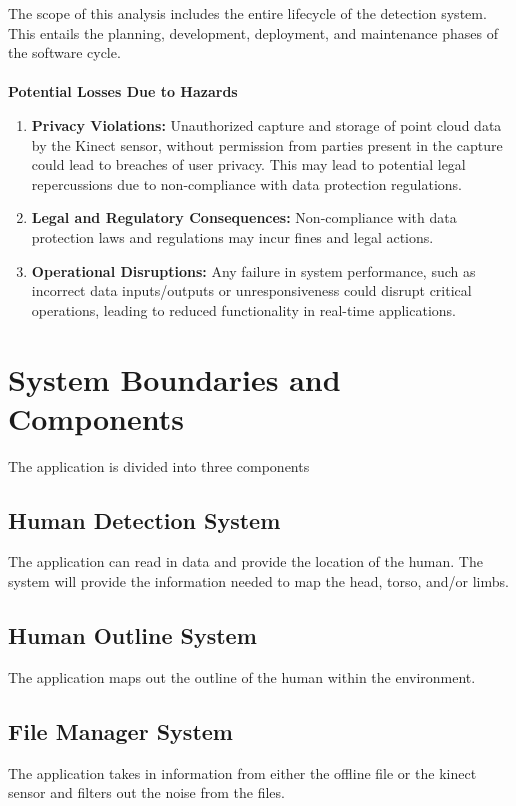 \documentclass{article}
\begin{document}
The scope of this analysis includes the entire lifecycle of the detection system. This entails the planning, 
development, deployment, and maintenance phases of the software cycle.\\
\\
\textbf{Potential Losses Due to Hazards}

\begin{enumerate}

\item \textbf{Privacy Violations:} Unauthorized capture and storage of point cloud data by the Kinect sensor, 
without permission from parties present in the capture could lead to breaches of user privacy. 
This may lead to potential legal repercussions due to non-compliance with data protection regulations.

\item \textbf{Legal and Regulatory Consequences:} Non-compliance with data protection laws and regulations may incur fines and legal actions.


\item \textbf{Operational Disruptions:} Any failure in system performance, such as incorrect data 
inputs/outputs or unresponsiveness could disrupt critical operations, leading to reduced functionality in 
real-time applications.

\end{enumerate}

\section{System Boundaries and Components}

The application is divided into three components
\subsection{Human Detection System}
The application can read in data and provide the location of the human.
The system will provide the information needed to map the head, torso, and/or limbs.
\subsection{Human Outline System}
The application maps out the outline of the human within the environment.
\subsection{File Manager System}
The application takes in information from either the offline file or the kinect sensor and filters out the noise from the files.
\end{document}
